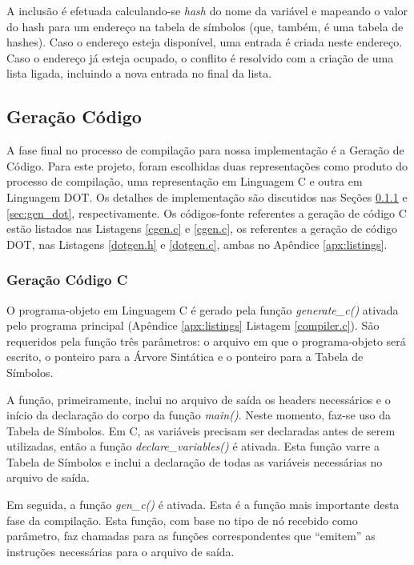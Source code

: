A inclusão é efetuada calculando-se \emph{hash} do nome da variável e mapeando
o valor do hash para um endereço na tabela de símbolos (que, também, é uma
tabela de hashes). Caso o endereço esteja disponível, uma entrada é criada
neste endereço. Caso o endereço já esteja ocupado, o conflito é resolvido com
a criação de uma lista ligada, incluindo a nova entrada no final da lista.

\subsection{Geração Código}
\label{sec:gencode}

A fase final no processo de compilação para nossa implementação é a Geração de
Código. Para este projeto, foram escolhidas duas representações como produto
do processo de compilação, uma representação em Linguagem C e outra em
Linguagem DOT. Os detalhes de implementação são discutidos nas Seções
\ref{sec:gen_c} e \ref{sec:gen_dot}, respectivamente. Os códigos-fonte
referentes a geração de código C estão listados nas Listagens \ref{cgen.c}
e \ref{cgen.c}, os referentes a geração de código DOT, nas Listagens
\ref{dotgen.h} e \ref{dotgen.c}, ambas no Apêndice \ref{apx:listings}.


\subsubsection{Geração Código C}
\label{sec:gen_c}
O programa-objeto em Linguagem C é gerado pela função \emph{generate\_c()}
ativada pelo programa principal (Apêndice \ref{apx:listings} Listagem
\ref{compiler.c}). São requeridos pela função três parâmetros: o arquivo em
que o programa-objeto será escrito, o ponteiro para a Árvore Sintática e o
ponteiro para a Tabela de Símbolos.

A função, primeiramente, inclui no arquivo de saída os headers necessários e
o início da declaração do corpo da função \emph{main()}. Neste momento, faz-se
uso da Tabela de Símbolos. Em C, as variáveis precisam ser declaradas antes de
serem utilizadas, então a função \emph{declare\_variables()} é ativada. Esta
função varre a Tabela de Símbolos e inclui a declaração de todas as variáveis
necessárias no arquivo de saída.

Em seguida, a função \emph{gen\_c()} é ativada. Esta é a função mais
importante desta fase da compilação. Esta função, com base no tipo de nó
recebido como parâmetro, faz chamadas para as funções correspondentes que
``emitem'' as instruções necessárias para o arquivo de saída.


